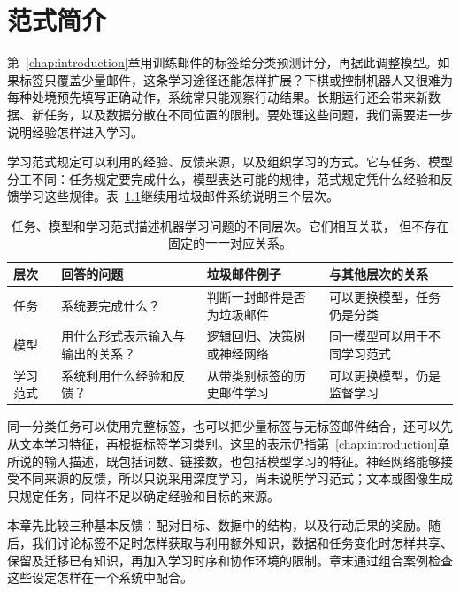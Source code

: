 \chapter{范式简介}
\label{chap:machine-learning-paradigms}

第~\ref{chap:introduction}章用训练邮件的标签给分类预测计分，再据此调整模型。如果标签只覆盖少量邮件，这条学习途径还能怎样扩展？下棋或控制机器人又很难为每种处境预先填写正确动作，系统常只能观察行动结果。长期运行还会带来新数据、新任务，以及数据分散在不同位置的限制。要处理这些问题，我们需要进一步说明经验怎样进入学习。

学习范式规定可以利用的经验、反馈来源，以及组织学习的方式。它与任务、模型分工不同：任务规定要完成什么，模型表达可能的规律，范式规定凭什么经验和反馈学习这些规律。表~\ref{tab:task-paradigm-model}继续用垃圾邮件系统说明三个层次。

\begin{table}[htbp]
  \centering
  \small
  \begin{tabularx}{\linewidth}{@{}lXXX@{}}
    \toprule
    \textbf{层次} & \textbf{回答的问题} & \textbf{垃圾邮件例子} & \textbf{与其他层次的关系} \\
    \midrule
    任务 & 系统要完成什么？ & 判断一封邮件是否为垃圾邮件 & 可以更换模型，任务仍是分类 \\
    模型 & 用什么形式表示输入与输出的关系？ & 逻辑回归、决策树或神经网络 & 同一模型可以用于不同学习范式 \\
    学习范式 & 系统利用什么经验和反馈？ & 从带类别标签的历史邮件学习 & 可以更换模型，仍是监督学习 \\
    \bottomrule
  \end{tabularx}
  \caption{任务、模型和学习范式描述机器学习问题的不同层次。它们相互关联，
  但不存在固定的一一对应关系。}
  \label{tab:task-paradigm-model}
\end{table}
\FloatBarrier

同一分类任务可以使用完整标签，也可以把少量标签与无标签邮件结合，还可以先从文本学习特征，再根据标签学习类别。这里的表示仍指第~\ref{chap:introduction}章所说的输入描述，既包括词数、链接数，也包括模型学习的特征。神经网络能够接受不同来源的反馈，所以只说采用深度学习，尚未说明学习范式；文本或图像生成只规定任务，同样不足以确定经验和目标的来源。

本章先比较三种基本反馈：配对目标、数据中的结构，以及行动后果的奖励。随后，我们讨论标签不足时怎样获取与利用额外知识，数据和任务变化时怎样共享、保留及迁移已有知识，再加入学习时序和协作环境的限制。章末通过组合案例检查这些设定怎样在一个系统中配合。

